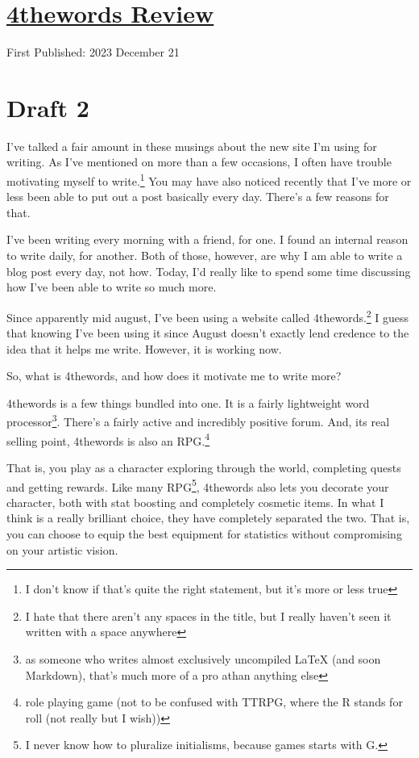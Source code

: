 \documentclass[12pt]{article}[titlepage]
\renewcommand{\,}{\textsuperscript{,}}
\begin{document}
\doublespacing
\section{\href{4thewords.html}{4thewords Review}}
First Published: 2023 December 21

\section{Draft 2}
I've talked a fair amount in these musings about the new site I'm using for writing.
As I've mentioned on more than a few occasions, I often have trouble motivating myself to write.\footnote{I don't know if that's quite the right statement, but it's more or less true}
You may have also noticed recently that I've more or less been able to put out a post basically every day.
There's a few reasons for that.

I've been writing every morning with a friend, for one.
I found an internal reason to write daily, for another.
Both of those, however, are why I am able to write a blog post every day, not how.
Today, I'd really like to spend some time discussing how I've been able to write so much more.

Since apparently mid august, I've been using a website called 4thewords.\footnote{I hate that there aren't any spaces in the title, but I really haven't seen it written with a space anywhere}
I guess that knowing I've been using it since August doesn't exactly lend credence to the idea that it helps me write.
However, it is working now.

So, what is 4thewords, and how does it motivate me to write more?

4thewords is a few things bundled into one.
It is a fairly lightweight word processor\footnote{as someone who writes almost exclusively uncompiled LaTeX (and soon Markdown), that's much more of a pro athan anything else}.
There's a fairly active and incredibly positive forum.
And, its real selling point, 4thewords is also an RPG.\footnote{role playing game (not to be confused with TTRPG, where the R stands for roll (not really but I wish))}

That is, you play as a character exploring through the world, completing quests and getting rewards.
Like many RPG\footnote{I never know how to pluralize initialisms, because games starts with G.}, 4thewords also lets you decorate your character, both with stat boosting and completely cosmetic items.
In what I think is a really brilliant choice, they have completely separated the two.
That is, you can choose to equip the best equipment for statistics without compromising on your artistic vision.
\end{document}

